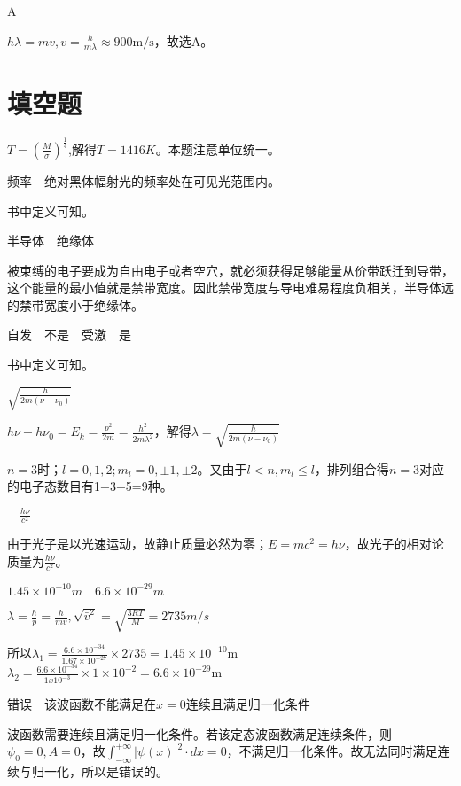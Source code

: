 \exercise A

\solve $h\lambda=mv,v=\frac{h}{m\lambda}\approx900\mathrm{m/s}$，故选A。

\section{填空题}


\solve $T=(\frac{M}{\sigma})^\frac{1}{4}$,解得$T=1416K$。本题注意单位统一。

\exercise 频率$\quad$绝对黑体幅射光的频率处在可见光范围内。

\solve 书中定义可知。

\exercise 半导体$\quad$绝缘体

\solve 被束缚的电子要成为自由电子或者空穴，就必须获得足够能量从价带跃迁到导带，这个能量的最小值就是禁带宽度。因此禁带宽度与导电难易程度负相关，半导体远的禁带宽度小于绝缘体。

\exercise 自发$\quad$不是$\quad$受激$\quad$是

\solve 书中定义可知。

\exercise $\sqrt{\frac{h}{2m(\nu-\nu_0)}}$

\solve $h\nu-h\nu_0=E_k=\frac{p^2}{2m}=\frac{h^2}{2m\lambda^2}$，解得$\lambda=\sqrt{\frac{h}{2m(\nu-\nu_0)}}$


\solve $n=3$时；$l=0,1,2;m_l=0,\pm1,\pm2$。又由于$l<n,m_l\le l$，排列组合得$n=3$对应的电子态数目有1+3+5=9种。

$\quad\frac{h\nu}{c^2}$

\solve 由于光子是以光速运动，故静止质量必然为零；$E=mc^2=h\nu$，故光子的相对论质量为$\frac{h\nu}{c^2}$。

\exercise $1.45\times10^{-10}m\quad6.6\times10^{-29}m$

\solve$\lambda=\frac{h}{p}=\frac{h}{mv},\sqrt{\bar{v}^2}=\sqrt{\frac{3RT}{M}}=2735m/s$

所以$\lambda_1=\frac{6.6\times10^{-34}}{1.67\times10^{-27}}\times2735=1.45\times10^{-10}\mathrm{m}$
$\lambda_2=\frac{6.6\times10^{-34}}{1x10^{-3}}\times1\times10^{-2}=6.6\times10^{-29}\mathrm{m}$

\exercise 错误$\quad$该波函数不能满足在$x=0$连续且满足归一化条件

\solve 波函数需要连续且满足归一化条件。若该定态波函数满足连续条件，则$\psi_0=0,A=0$，故$  \int_{-\infty}^{+\infty}|\psi(x)|^2\cdot dx=0$，不满足归一化条件。故无法同时满足连续与归一化，所以是错误的。

